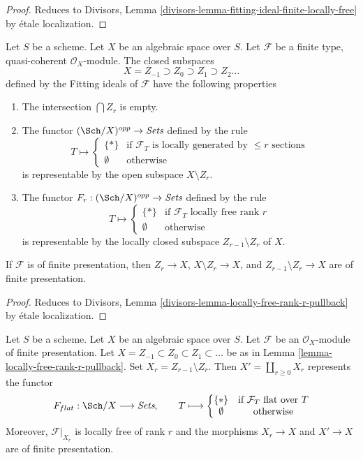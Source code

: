 \begin{proof}
Reduces to
Divisors, Lemma \ref{divisors-lemma-fitting-ideal-finite-locally-free}
by \'etale localization.
\end{proof}

\begin{lemma}
\label{lemma-locally-free-rank-r-pullback}
Let $S$ be a scheme. Let $X$ be an algebraic space over $S$.
Let $\mathcal{F}$ be a finite type, quasi-coherent
$\mathcal{O}_X$-module. The closed subspaces
$$
X = Z_{-1} \supset Z_0 \supset Z_1 \supset Z_2 \ldots
$$
defined by the Fitting ideals of $\mathcal{F}$ have the following
properties
\begin{enumerate}
\item The intersection $\bigcap Z_r$ is empty.
\item The functor $(\Sch/X)^{opp} \to \textit{Sets}$ defined by the rule
$$
T \longmapsto
\left\{
\begin{matrix}
\{*\} & \text{if }\mathcal{F}_T\text{ is locally generated by }
\leq r\text{ sections} \\
\emptyset & \text{otherwise}
\end{matrix}
\right.
$$
is representable by the open subspace $X \setminus Z_r$.
\item The functor $F_r : (\Sch/X)^{opp} \to \textit{Sets}$ defined by the rule
$$
T \longmapsto
\left\{
\begin{matrix}
\{*\} & \text{if }\mathcal{F}_T\text{ locally free rank }r\\
\emptyset & \text{otherwise}
\end{matrix}
\right.
$$
is representable by the locally closed subspace $Z_{r - 1} \setminus Z_r$
of $X$.
\end{enumerate}
If $\mathcal{F}$ is of finite presentation, then
$Z_r \to X$, $X \setminus Z_r \to X$, and $Z_{r - 1} \setminus Z_r \to X$
are of finite presentation.
\end{lemma}

\begin{proof}
Reduces to
Divisors, Lemma \ref{divisors-lemma-locally-free-rank-r-pullback}
by \'etale localization.
\end{proof}

\begin{lemma}
\label{lemma-finite-presentation-module}
Let $S$ be a scheme. Let $X$ be an algebraic space over $S$.
Let $\mathcal{F}$ be an $\mathcal{O}_X$-module
of finite presentation. Let $X = Z_{-1} \subset Z_0 \subset Z_1 \subset \ldots$
be as in Lemma \ref{lemma-locally-free-rank-r-pullback}.
Set $X_r = Z_{r - 1} \setminus Z_r$.
Then $X' = \coprod_{r \geq 0} X_r$ represents the functor
$$
F_{flat} : \Sch/X \longrightarrow \textit{Sets},\quad\quad
T \longmapsto
\left\{
\begin{matrix}
\{*\} & \text{if }\mathcal{F}_T\text{ flat over }T\\
\emptyset & \text{otherwise}
\end{matrix}
\right.
$$
Moreover, $\mathcal{F}|_{X_r}$ is locally free of rank $r$ and the
morphisms $X_r \to X$ and $X' \to X$ are of finite presentation.
\end{lemma}

